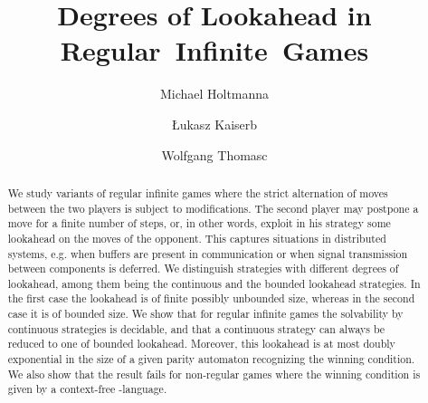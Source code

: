 \documentclass[fleqn,envcountsame]{LMCS}
\newcommand{\eg}{e.g.\xspace}
\begin{document}
\title[Degrees of Lookahead in Regular~Infinite~Games]{Degrees of Lookahead in Regular~Infinite~Games}

\author[M.~Holtmann]{Michael Holtmann\rsuper a}
\address{{\lsuper a}Lehrstuhl f{\"u}r Informatik 7, RWTH Aachen University}

\author[{\L}.~Kaiser]{{\L}ukasz Kaiser\rsuper b}
\address{{\lsuper b}LIAFA, CNRS \& Universit{\'e} Paris Diderot -- Paris 7}

\author[W.~Thomas]{Wolfgang Thomas\rsuper c}
\address{{\lsuper c}Lehrstuhl f{\"u}r Informatik 7, RWTH Aachen University}


\begin{abstract}
We study variants of regular infinite games where the strict alternation
of moves between the two players is subject to modifications.
The second player may postpone a move for a finite number of steps,
or, in other words, exploit in his strategy some lookahead on the moves
of the opponent. This captures situations in distributed systems, \eg
when buffers are present in communication or when signal transmission
between components is deferred. We distinguish strategies with
different degrees of lookahead, among them being the continuous and
the bounded lookahead strategies. In the first case the lookahead is of finite
possibly unbounded size, whereas in the second case it is of bounded size.
We show that for regular infinite games the solvability by continuous strategies
is decidable, and that a continuous strategy can always be reduced to one
of bounded lookahead. Moreover, this lookahead is at most doubly exponential
in the size of a given parity automaton recognizing the winning condition.
We also show that the result fails for non-regular games
where the winning condition is given by a context-free -language.
\end{abstract}

\maketitle
\end{document}
